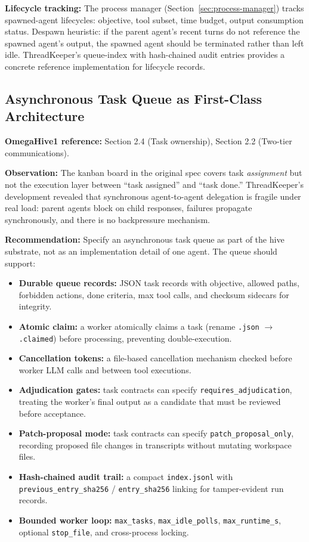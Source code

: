 \documentclass[11pt,a4paper]{article}
\begin{document}
\textbf{Lifecycle tracking:} The process manager (Section~\ref{sec:process-manager})
tracks spawned-agent lifecycles: objective, tool subset, time budget, output
consumption status. Despawn heuristic: if the parent agent's recent turns do not
reference the spawned agent's output, the spawned agent should be terminated
rather than left idle. ThreadKeeper's queue-index with hash-chained audit
entries provides a concrete reference implementation for lifecycle records.

\subsection{Asynchronous Task Queue as First-Class Architecture}
\label{sec:async-queue}

\textbf{OmegaHive1 reference:} Section 2.4 (Task ownership), Section 2.2 (Two-tier communications).

\textbf{Observation:} The kanban board in the original spec covers task
\emph{assignment} but not the execution layer between ``task assigned'' and
``task done.'' ThreadKeeper's development revealed that synchronous
agent-to-agent delegation is fragile under real load: parent agents block on
child responses, failures propagate synchronously, and there is no
backpressure mechanism.

\textbf{Recommendation:} Specify an asynchronous task queue as part of the hive
substrate, not as an implementation detail of one agent. The queue should
support:

\begin{itemize}[nosep]
  \item \textbf{Durable queue records:} JSON task records with objective,
    allowed paths, forbidden actions, done criteria, max tool calls, and
    checksum sidecars for integrity.
  \item \textbf{Atomic claim:} a worker atomically claims a task
    (rename \texttt{.json} $\to$ \texttt{.claimed}) before processing, preventing
    double-execution.
  \item \textbf{Cancellation tokens:} a file-based cancellation mechanism
    checked before worker LLM calls and between tool executions.
  \item \textbf{Adjudication gates:} task contracts can specify
    \texttt{requires\_adjudication}, treating the worker's final output as a
    candidate that must be reviewed before acceptance.
  \item \textbf{Patch-proposal mode:} task contracts can specify
    \texttt{patch\_proposal\_only}, recording proposed file changes in
    transcripts without mutating workspace files.
  \item \textbf{Hash-chained audit trail:} a compact
    \texttt{index.jsonl} with \texttt{previous\_entry\_sha256} /
    \texttt{entry\_sha256} linking for tamper-evident run records.
  \item \textbf{Bounded worker loop:} \texttt{max\_tasks},
    \texttt{max\_idle\_polls}, \texttt{max\_runtime\_s}, optional
    \texttt{stop\_file}, and cross-process locking.
\end{itemize}
\end{document}
